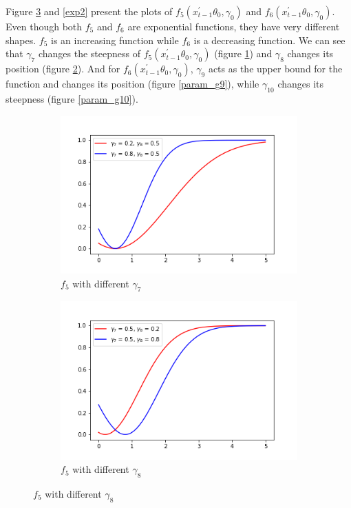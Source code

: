 \documentclass[a4paper,12pt,times,numbered,print,index]{report}
\numberwithin{equation}{section}
\begin{document}
	Figure \ref{exp1} and \ref{exp2} present the plots of $f_{5}\left(x_{t-1}^{\prime }\theta _{0},\gamma_{0}\right)$ and $f_{6}\left(x_{t-1}^{\prime }\theta _{0},\gamma_{0}\right)$. Even though both $f_5$ and $f_6$ are exponential functions, they have very different shapes. $f_5$ is an increasing function while $f_6$ is a decreasing function. We can see that $\gamma_{7}$ changes the steepness of $f_{5}\left(x_{t-1}^{\prime }\theta _{0},\gamma_{0}\right)$ (figure \ref{param_g7}) and $\gamma_{8}$ changes its position (figure \ref{param_g8}). And for $f_{6}\left(x_{t-1}^{\prime }\theta _{0},\gamma_{0}\right)$, $\gamma_{9}$ acts as the upper bound for the function and changes its position (figure \ref{param_g9}), while $\gamma_{10}$ changes its steepness (figure \ref{param_g10}).
	
	\begin{figure}[!htbp]
	\centering
	\caption{$f_{5}\left(x_{t-1}^{\prime }\theta _{0},\gamma_{0}\right)$ with different $\gamma$}
	\begin{subfigure}[b]{0.44\linewidth}
		\includegraphics[width=\linewidth]{plots/scale_expshift_g7.png}
		\caption{$f_{5}$ with different $\gamma_{7}$}
		\label{param_g7}
	\end{subfigure}
	\begin{subfigure}[b]{0.44\linewidth}
		\includegraphics[width=\linewidth]{plots/scale_expshift_g8.png}
		\caption{$f_{5}$ with different $\gamma_{8}$}
		\label{param_g8}
	\end{subfigure}
	\label{exp1}
	\end{figure}
\end{document}
